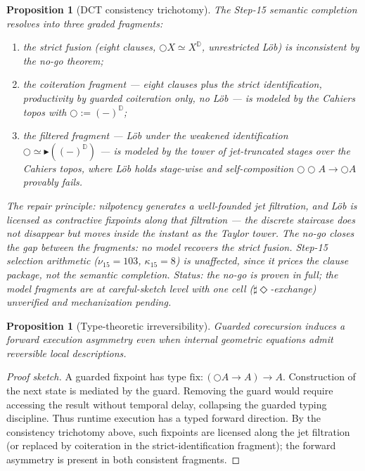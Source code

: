 \documentclass[11pt]{article}
\theoremstyle{plain}
\newtheorem{proposition}[theorem]{Proposition}
\theoremstyle{definition}
\theoremstyle{remark}
\newenvironment{proofsketch}{\begin{proof}[Proof sketch]}{\end{proof}}
\newcommand{\Sharp}{\sharp}
\newcommand{\Next}{\bigcirc}
\newcommand{\Eventually}{\Diamond}
\newcommand{\D}{\mathbb{D}}
\begin{document}
\begin{proposition}[DCT consistency trichotomy]
The Step-15 semantic completion resolves into three graded fragments:
\begin{enumerate}[leftmargin=*]
\item the strict fusion (eight clauses, \(\Next X\simeq X^{\D}\), unrestricted L\"ob) is inconsistent by the no-go theorem;
\item the coiteration fragment --- eight clauses plus the strict identification, productivity by guarded coiteration only, no L\"ob --- is modeled by the Cahiers topos with \(\Next:=(-)^{\D}\);
\item the filtered fragment --- L\"ob under the weakened identification \(\Next\simeq\blacktriangleright((-)^{\D})\) --- is modeled by the tower of jet-truncated stages over the Cahiers topos, where L\"ob holds stage-wise and self-composition \(\Next\Next A\to\Next A\) provably fails.
\end{enumerate}
The repair principle: nilpotency generates a well-founded jet filtration, and L\"ob is licensed as contractive fixpoints along that filtration --- the discrete staircase does not disappear but moves inside the instant as the Taylor tower. The no-go closes the gap between the fragments: no model recovers the strict fusion. Step-15 selection arithmetic (\(\nu_{15}=103\), \(\kappa_{15}=8\)) is unaffected, since it prices the clause package, not the semantic completion. Status: the no-go is proven in full; the model fragments are at careful-sketch level with one cell (\(\Sharp\Eventually\)-exchange) unverified and mechanization pending.
\end{proposition}

\begin{proposition}[Type-theoretic irreversibility]
Guarded corecursion induces a forward execution asymmetry even when internal geometric equations admit reversible local descriptions.
\end{proposition}

\begin{proofsketch}
A guarded fixpoint has type \(\mathrm{fix}:(\Next A\to A)\to A\). Construction of the next state is mediated by the guard. Removing the guard would require accessing the result without temporal delay, collapsing the guarded typing discipline. Thus runtime execution has a typed forward direction. By the consistency trichotomy above, such fixpoints are licensed along the jet filtration (or replaced by coiteration in the strict-identification fragment); the forward asymmetry is present in both consistent fragments.
\end{proofsketch}
\end{document}
